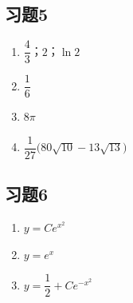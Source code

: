 \documentclass[a4paper,12pt]{ctexart}
\begin{document}
\subsection*{习题5}
\begin{enumerate}
  \item $\dfrac43$；$2$；$\ln2$
  \item $\dfrac16$
  \item $8\pi$
  \item $\dfrac1{27}\bigl(80\sqrt{10}-13\sqrt{13}\bigr)$
\end{enumerate}

\subsection*{习题6}
\begin{enumerate}
  \item $y=Ce^{x^2}$
  \item $y=e^x$
  \item $y=\dfrac12+Ce^{-x^2}$
\end{enumerate}
\end{document}
